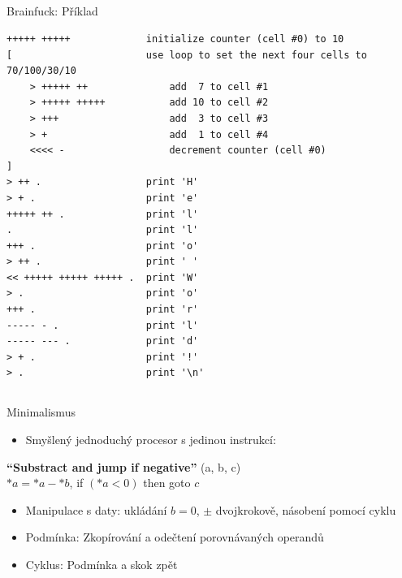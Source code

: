 \documentclass{beamer}
\begin{document}
\subsection{}
\begin{frame}[fragile]{Brainfuck: Příklad}
\begin{lstlisting}
+++++ +++++             initialize counter (cell #0) to 10
[                       use loop to set the next four cells to 70/100/30/10
    > +++++ ++              add  7 to cell #1
    > +++++ +++++           add 10 to cell #2 
    > +++                   add  3 to cell #3
    > +                     add  1 to cell #4
    <<<< -                  decrement counter (cell #0)
]                   
> ++ .                  print 'H'
> + .                   print 'e'
+++++ ++ .              print 'l'
.                       print 'l'
+++ .                   print 'o'
> ++ .                  print ' '
<< +++++ +++++ +++++ .  print 'W'
> .                     print 'o'
+++ .                   print 'r'
----- - .               print 'l'
----- --- .             print 'd'
> + .                   print '!'
> .                     print '\n'
\end{lstlisting}
\end{frame}

\subsection{}
\begin{frame}{Minimalismus}
\begin{itemize}
\item Smyšlený jednoduchý procesor s jedinou instrukcí:
\end{itemize}
\begin{center}
{\bf ``Substract and jump if negative''} (a, b, c) \\
$*a = *a - *b$, if $(*a < 0)$ then goto $c$
\end{center}
\begin{itemize}
\item Manipulace s daty: ukládání $b = 0$, $\pm$ dvojkrokově, násobení pomocí cyklu
\pause
\item Podmínka: Zkopírování a odečtení porovnávaných operandů
\item Cyklus: Podmínka a skok zpět
\end{itemize}
\end{frame}
\end{document}
